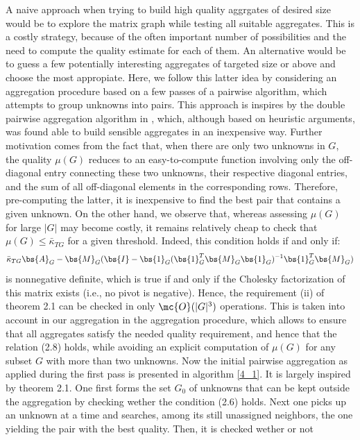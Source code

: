 A naive approach when trying to build high quality aggrgates of desired size
would be to explore the matrix graph while testing all suitable aggregates.
This is a costly strategy, because of the often important number of
possibilities and the need to compute the quality estimate for each of them.
An alternative would be to guess a few potentially interesting aggregates of
targeted size or above and choose the most appropiate. Here, we follow this
latter idea by considering an aggregation procedure based on a few passes of a
pairwise algorithm, which attempts to group unknowns into pairs. This approach
is inspires by the double pairwise aggregation algorithm in \cite{agmg},
which, although based on heuristic arguments, was found able to build sensible
aggregates in an inexpensive way. Further motivation comes from the fact that,
when there are only two unknowns in $G$, the quality $\mu(G)$ reduces to an
easy-to-compute function involving only the off-diagonal entry connecting
these two unknowns, their respective diagonal entries, and the sum of all
off-diagonal elements in the corresponding rows. Therefore, pre-computing the
latter, it is inexpensive to find the best pair that contains a given unknown.
On the other hand, we observe that, whereas assessing $\mu(G)$ for large $|G|$
may become costly, it remains relatively cheap to check that $\mu(G)\leq
\bar{\kappa}_{TG}$ for a given threshold. Indeed, this condition holds if and
only if:
\begin{equation}
\bar{\kappa}_{TG} \bs{A}_G - \bs{M}_G (\bs{I} -
\bs{1}_G(\bs{1}_G^T\bs{M}_G\bs{1}_G)^{-1} \bs{1}_G^T \bs{M}_G)
\end{equation}
is nonnegative definite, which is true if and only if the Cholesky
factorization of this matrix exists (i.e., no pivot is negative). Hence, the
requirement (ii) of theorem 2.1 can be checked in only $\mc{O}(|G|^3)$
operations. This is taken into account in our aggregation in the aggregation
procedure, which allows to ensure that all aggregates satisfy the needed
quality requirement, and hence that the relation (2.8) holds, while avoiding
an explicit computation of $\mu(G)$ for any subset $G$ with more than two
unknowns. Now the initial pairwise aggregation as applied during the first
pass is presented in algorithm \ref{4_1}. It is largely inspired by theorem
2.1. One first forms the set $G_0$ of unknowns that can be kept outside the
aggregation by checking wether the condition (2.6) holds. Next one picks up an
unknown at a time and searches, among its still unassigned neighbors, the one
yielding the pair with the best quality. Then, it is checked wether or not
